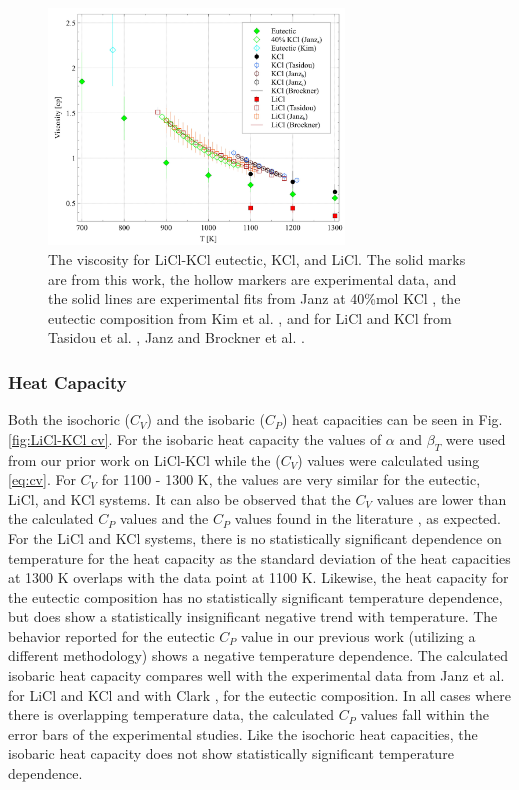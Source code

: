 \documentclass[review]{elsarticle}
\begin{document}
\begin{figure}[h]
 \centering
 \includegraphics[width=0.7\textwidth]{visc_licl-kcl.jpg} 
 \caption{The viscosity for LiCl-KCl eutectic, KCl, and LiCl. The solid marks are from this work, the hollow markers are experimental data, and the solid lines are experimental fits from Janz at 40\%mol KCl \cite{janz_visc}, the eutectic composition from Kim et al. \cite{kim2012high}, and for LiCl and KCl from Tasidou et al. \cite{Tasidou}, Janz \cite{janz_nist,janz_osti} and Brockner et al. \cite{brockner1975high}.}
 \label{fig:LiCl-KCl visc}
\end{figure} 

\FloatBarrier
\subsubsection{Heat Capacity}
Both the isochoric ($C_V$) and the isobaric ($C_P$) heat capacities can be seen in Fig. \ref{fig:LiCl-KCl cv}. For the isobaric heat capacity the values of \textit{$\alpha$} and \textit{$\beta_T$} were used from our prior work on LiCl-KCl \cite{duemmler_liclkcl} while the ($C_V$) values were calculated using \cref{eq:cv}. For $C_V$ for 1100 - 1300 K, the values are very similar for the eutectic, LiCl, and KCl systems. It can also be observed that the $C_V$ values are lower than the calculated $C_P$ values and the $C_P$ values found in the literature \cite{clark1973heats,janz_osti}, as expected. For the LiCl and KCl systems, there is no statistically significant dependence on temperature for the heat capacity as the standard deviation of the heat capacities at 1300 K overlaps with the data point at 1100 K. Likewise, the heat capacity for the eutectic composition has no statistically significant temperature dependence, but does show a statistically insignificant negative trend with temperature. The behavior reported for the eutectic $C_P$ value in our previous work \cite{duemmler_liclkcl} (utilizing a different methodology) shows a negative temperature dependence. The calculated isobaric heat capacity compares well with the experimental data from Janz et al. \cite{janz_osti} for LiCl and KCl and with Clark \cite{clark1973heats}, for the eutectic composition. In all cases where there is overlapping temperature data, the calculated $C_P$ values fall within the error bars of the experimental studies. Like the isochoric heat capacities, the isobaric heat capacity does not show statistically significant temperature dependence.
\end{document}

